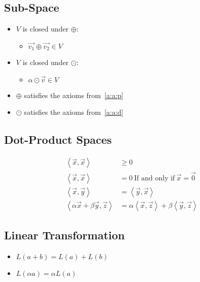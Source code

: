 \documentclass[12pt]{article}
\begin{document}
\subsection{Sub-Space}\label{a:s}
\begin{itemize}
  \item $V$ is closed under $\oplus$:
    \begin{itemize}
      \item $\vec{v_1} \oplus \vec{v_2} \in V$
    \end{itemize}
  \item $V$ is closed under $\odot$:
    \begin{itemize}
      \item $\alpha \odot \vec{v} \in V$
    \end{itemize}
  \item $\oplus$ satisfies the axioms from~\ref{a:a:p} 
  \item $\odot$ satisfies the axioms from~\ref{a:a:d}
\end{itemize}
\subsection{Dot-Product Spaces}\label{a:d}
\begin{align}
  \left<\vec{x},\vec{x}\right> &\geq 0\\
  \left<\vec{x},\vec{x}\right> &= 0\ \text{If and only if}\ \vec{x} = \vec{0}\\
  \left<\vec{x},\vec{y}\right> &= \left<\vec{y},\vec{x}\right>\\
  \left<\alpha\vec{x} + \beta\vec{y},\vec{z}\right> &= \alpha\left<\vec{x},\vec{z}\right>+\beta\left<\vec{y},\vec{z}\right>
\end{align}
\subsection{Linear Transformation}\label{a:l}
\begin{itemize}
  \item $L(a+b) = L(a) + L(b)$
  \item $L(\alpha a) = \alpha L(a)$
\end{itemize}
\end{document}
